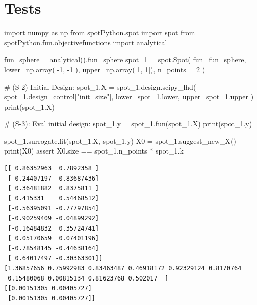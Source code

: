 \documentclass[
  letterpaper,
  DIV=11,
  numbers=noendperiod]{scrreprt}
\newenvironment{Shaded}{\begin{snugshade}}{\end{snugshade}}
\newcommand{\BuiltInTok}[1]{\textcolor[rgb]{0.00,0.23,0.31}{#1}}
\newcommand{\CommentTok}[1]{\textcolor[rgb]{0.37,0.37,0.37}{#1}}
\newcommand{\ControlFlowTok}[1]{\textcolor[rgb]{0.00,0.23,0.31}{#1}}
\newcommand{\DecValTok}[1]{\textcolor[rgb]{0.68,0.00,0.00}{#1}}
\newcommand{\ImportTok}[1]{\textcolor[rgb]{0.00,0.46,0.62}{#1}}
\newcommand{\NormalTok}[1]{\textcolor[rgb]{0.00,0.23,0.31}{#1}}
\newcommand{\OperatorTok}[1]{\textcolor[rgb]{0.37,0.37,0.37}{#1}}
\newcommand{\StringTok}[1]{\textcolor[rgb]{0.13,0.47,0.30}{#1}}
\begin{document}
\hypertarget{tests}{%
\section{Tests}\label{tests}}

\begin{Shaded}
\begin{Highlighting}[]
\ImportTok{import}\NormalTok{ numpy }\ImportTok{as}\NormalTok{ np}
\ImportTok{from}\NormalTok{ spotPython.spot }\ImportTok{import}\NormalTok{ spot}
\ImportTok{from}\NormalTok{ spotPython.fun.objectivefunctions }\ImportTok{import}\NormalTok{ analytical}

\NormalTok{fun\_sphere }\OperatorTok{=}\NormalTok{ analytical().fun\_sphere}
\NormalTok{spot\_1 }\OperatorTok{=}\NormalTok{ spot.Spot(}
\NormalTok{    fun}\OperatorTok{=}\NormalTok{fun\_sphere,}
\NormalTok{    lower}\OperatorTok{=}\NormalTok{np.array([}\OperatorTok{{-}}\DecValTok{1}\NormalTok{, }\OperatorTok{{-}}\DecValTok{1}\NormalTok{]),}
\NormalTok{    upper}\OperatorTok{=}\NormalTok{np.array([}\DecValTok{1}\NormalTok{, }\DecValTok{1}\NormalTok{]),}
\NormalTok{    n\_points }\OperatorTok{=} \DecValTok{2}
\NormalTok{)}

\CommentTok{\# (S{-}2) Initial Design:}
\NormalTok{spot\_1.X }\OperatorTok{=}\NormalTok{ spot\_1.design.scipy\_lhd(}
\NormalTok{    spot\_1.design\_control[}\StringTok{"init\_size"}\NormalTok{], lower}\OperatorTok{=}\NormalTok{spot\_1.lower, upper}\OperatorTok{=}\NormalTok{spot\_1.upper}
\NormalTok{)}
\BuiltInTok{print}\NormalTok{(spot\_1.X)}

\CommentTok{\# (S{-}3): Eval initial design:}
\NormalTok{spot\_1.y }\OperatorTok{=}\NormalTok{ spot\_1.fun(spot\_1.X)}
\BuiltInTok{print}\NormalTok{(spot\_1.y)}

\NormalTok{spot\_1.surrogate.fit(spot\_1.X, spot\_1.y)}
\NormalTok{X0 }\OperatorTok{=}\NormalTok{ spot\_1.suggest\_new\_X()}
\BuiltInTok{print}\NormalTok{(X0)}
\ControlFlowTok{assert}\NormalTok{ X0.size }\OperatorTok{==}\NormalTok{ spot\_1.n\_points }\OperatorTok{*}\NormalTok{ spot\_1.k}
\end{Highlighting}
\end{Shaded}

\begin{verbatim}
[[ 0.86352963  0.7892358 ]
 [-0.24407197 -0.83687436]
 [ 0.36481882  0.8375811 ]
 [ 0.415331    0.54468512]
 [-0.56395091 -0.77797854]
 [-0.90259409 -0.04899292]
 [-0.16484832  0.35724741]
 [ 0.05170659  0.07401196]
 [-0.78548145 -0.44638164]
 [ 0.64017497 -0.30363301]]
[1.36857656 0.75992983 0.83463487 0.46918172 0.92329124 0.8170764
 0.15480068 0.00815134 0.81623768 0.502017  ]
[[0.00151305 0.00405727]
 [0.00151305 0.00405727]]
\end{verbatim}
\end{document}

